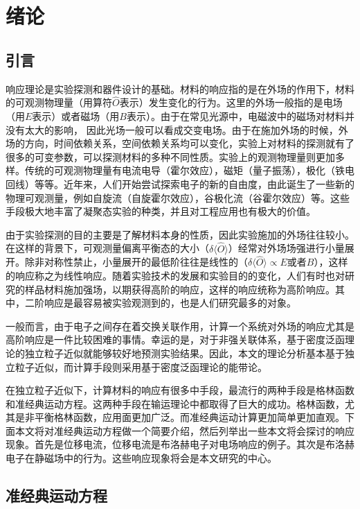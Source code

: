 \chapter{绪论}
\label{cha:intro}

\section{引言}

响应理论是实验探测和器件设计的基础。材料的响应指的是在外场的作用下，材料的可观测物理量（用算符$\hat{O}$表示）发生变化的行为。这里的外场一般指的是电场（用$E$表示）或者磁场（用$B$表示）。由于在常见光源中，电磁波中的磁场对材料并没有太大的影响， 因此光场一般可以看成交变电场。由于在施加外场的时候，外场的方向，时间依赖关系，空间依赖关系均可以变化，实验上对材料的探测就有了很多的可变参数，可以探测材料的多种不同性质。实验上的观测物理量则更加多样。传统的可观测物理量有电流电导（霍尔效应），磁矩（量子振荡），极化（铁电回线）等等。近年来，人们开始尝试探索电子的新的自由度，由此诞生了一些新的物理可观测量，例如自旋流（自旋霍尔效应），谷极化流（谷霍尔效应）等。这些手段极大地丰富了凝聚态实验的种类，并且对工程应用也有极大的价值。


由于实验探测的目的主要是了解材料本身的性质，因此实验施加的外场往往较小。在这样的背景下，可观测量偏离平衡态的大小（$\delta\langle\hat{O}\rangle$）经常对外场场强进行小量展开。除非对称性禁止，小量展开的最低阶往往是线性的（$\delta\langle\hat{O}\rangle \propto E$或者$B$），这样的响应称之为线性响应。随着实验技术的发展和实验目的的变化，人们有时也对研究的样品材料施加强场，以期获得高阶的响应，这样的响应统称为高阶响应。其中，二阶响应是最容易被实验观测到的，也是人们研究最多的对象。

一般而言，由于电子之间存在着交换关联作用，计算一个系统对外场的响应尤其是高阶响应是一件比较困难的事情。幸运的是，对于非强关联体系，基于密度泛函理论的独立粒子近似就能够较好地预测实验结果。因此，本文的理论分析基本基于独立粒子近似，而计算手段则采用基于密度泛函理论的能带论。

在独立粒子近似下，计算材料的响应有很多中手段，最流行的两种手段是格林函数和准经典运动方程。这两种手段在输运理论中都取得了巨大的成功。格林函数，尤其是非平衡格林函数，应用面更加广泛。而准经典运动计算更加简单更加直观。下面本文将对准经典运动方程做一个简要介绍，然后列举出一些本文将会探讨的响应现象。首先是位移电流，位移电流是布洛赫电子对电场响应的例子。其次是布洛赫电子在静磁场中的行为。这些响应现象将会是本文研究的中心。

\section{准经典运动方程}

